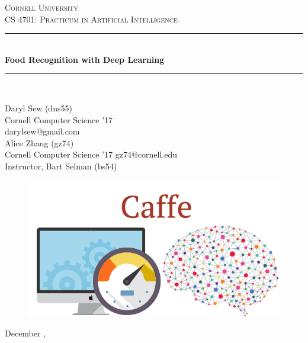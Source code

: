 \documentclass[leqno]{article}
\newcommand{\HRule}{\rule{\linewidth}{0.5mm}}
\begin{document}
\begin{titlepage}
\begin{center}

\textsc{\LARGE Cornell University}\\[1.5cm]

\textsc{\Large CS 4701: Practicum in Artificial Intelligence}\\[0.5cm]

\HRule \\[0.4cm]
{ \huge \bfseries Food Recognition with Deep Learning \\[0.4cm] }

\HRule \\[1.5cm]

\begin{minipage}{0.4\textwidth}
\begin{flushleft} \large
Daryl Sew (dns55) \\
Cornell Computer Science '17 \\
darylsew@gmail.com \\
\vspace{0.5cm}
Alice Zhang (gz74) \\
Cornell Computer Science '17
gz74@cornell.edu \\
\vspace{0.5cm}
Instructor, Bart Selman (bs54)\\
\end{flushleft}
\end{minipage}

\vspace{1cm}

\begin{figure}[h!]
  \centering
  \includegraphics[width=\textwidth]{caffe.png}
\end{figure}

\vfill

{\large December , }

\end{center}

\end{titlepage}
\end{document}
